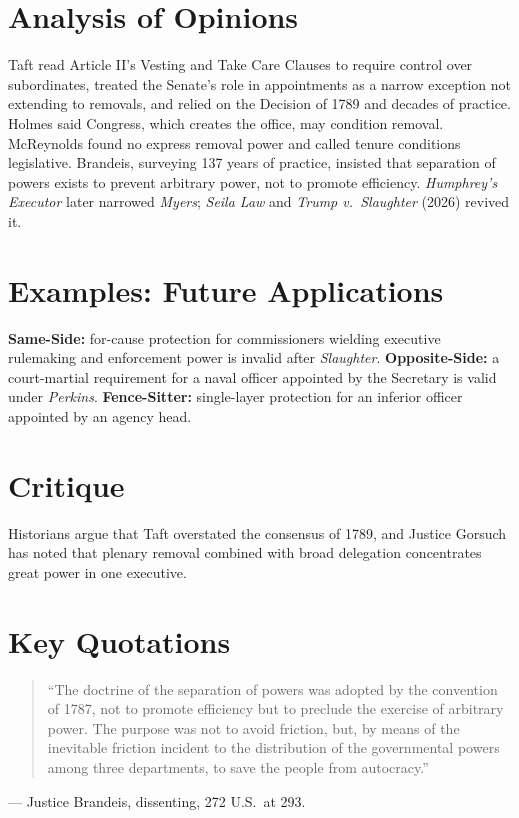 \documentclass[12pt]{article}
\begin{document}
\section{Analysis of Opinions}
Taft read Article II's Vesting and Take Care Clauses to require control over subordinates, treated the Senate's role in appointments as a narrow exception not extending to removals, and relied on the Decision of 1789 and decades of practice. Holmes said Congress, which creates the office, may condition removal. McReynolds found no express removal power and called tenure conditions legislative. Brandeis, surveying 137 years of practice, insisted that separation of powers exists to prevent arbitrary power, not to promote efficiency. \textit{Humphrey's Executor} later narrowed \textit{Myers}; \textit{Seila Law} and \textit{Trump v.\ Slaughter} (2026) revived it.

\section{Examples: Future Applications}
\textbf{Same-Side:} for-cause protection for commissioners wielding executive rulemaking and enforcement power is invalid after \textit{Slaughter}. \textbf{Opposite-Side:} a court-martial requirement for a naval officer appointed by the Secretary is valid under \textit{Perkins}. \textbf{Fence-Sitter:} single-layer protection for an inferior officer appointed by an agency head.

\section{Critique}
Historians argue that Taft overstated the consensus of 1789, and Justice Gorsuch has noted that plenary removal combined with broad delegation concentrates great power in one executive.

\section{Key Quotations}
\begin{quote}
``The doctrine of the separation of powers was adopted by the convention of 1787, not to promote efficiency but to preclude the exercise of arbitrary power. The purpose was not to avoid friction, but, by means of the inevitable friction incident to the distribution of the governmental powers among three departments, to save the people from autocracy.''
\end{quote}
\noindent --- Justice Brandeis, dissenting, 272 U.S.\ at 293.
\end{document}
